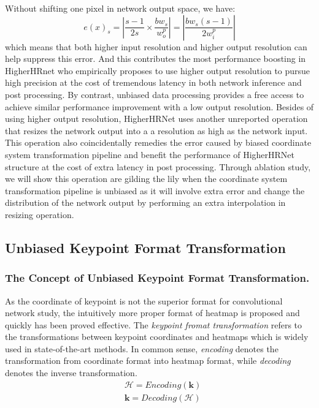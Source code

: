 \documentclass[10pt,journal,compsoc]{IEEEtran}
\begin{document}
Without shifting one pixel in network output space, we have:
\begin{equation}
    e(x)_s = |\frac{s-1}{2s}\times\frac{bw_s}{w_o^p}| = |\frac{bw_s(s-1)}{2w_i^p}|
\end{equation}
which means that both higher input resolution and higher output resolution can help suppress this error. And this contributes the most performance boosting in HigherHRnet \cite{Higher} who empirically proposes to use higher output resolution to pursue high precision at the cost of tremendous latency in both network inference and post processing. By contrast, unbiased data processing provides a free access to achieve similar performance improvement with a low output resolution. Besides of using higher output resolution, HigherHRNet uses another unreported operation that resizes the network output into a a resolution as high as the network input. This operation also coincidentally remedies the error caused by biased coordinate system transformation pipeline and benefit the performance of HigherHRNet structure at the cost of extra latency in post processing. Through ablation study, we will show this operation are gilding the lily when the coordinate system transformation pipeline is unbiased as it will involve extra error and change the distribution of the network output by performing an extra interpolation in resizing operation.


\subsection{Unbiased Keypoint Format Transformation}
\subsubsection{The Concept of Unbiased Keypoint Format Transformation.}
As the coordinate of keypoint is not the superior format for convolutional network study, the intuitively more proper format of heatmap is proposed and quickly has been proved effective. The \textit{keypoint fromat transformation} refers to the transformations between keypoint coordinates and heatmaps which is widely used in state-of-the-art methods. In common sense, \textit{encoding} denotes the transformation from coordinate format into heatmap format, while \textit{decoding} denotes the inverse transformation.
\begin{equation}
    \begin{split}
    &\mathcal{H} = Encoding(\textbf{k})\\
    &\textbf{k} = Decoding(\mathcal{H})
    \end{split}
\end{equation}
\end{document}
